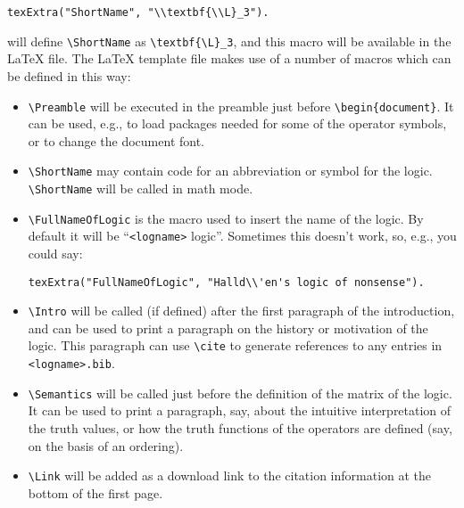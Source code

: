 \documentclass[]{article}
\begin{document}
\begin{itemize}
\begin{verbatim}
texExtra("ShortName", "\\textbf{\\L}_3").
\end{verbatim}

  will define \texttt{\textbackslash{}ShortName} as
  \texttt{\textbackslash{}textbf\{\textbackslash{}L\}\_3}, and this
  macro will be available in the LaTeX file. The LaTeX template file
  makes use of a number of macros which can be defined in this way:

  \begin{itemize}
  \item
    \texttt{\textbackslash{}Preamble} will be executed in the preamble
    just before \texttt{\textbackslash{}begin\{document\}}. It can be
    used, e.g., to load packages needed for some of the operator
    symbols, or to change the document font.
  \item
    \texttt{\textbackslash{}ShortName} may contain code for an
    abbreviation or symbol for the logic.
    \texttt{\textbackslash{}ShortName} will be called in math mode.
  \item
    \texttt{\textbackslash{}FullNameOfLogic} is the macro used to insert
    the name of the logic. By default it will be
    ``\texttt{\textless{}logname\textgreater{}} logic''. Sometimes this
    doesn't work, so, e.g., you could say:

\begin{verbatim}
texExtra("FullNameOfLogic", "Halld\\'en's logic of nonsense").
\end{verbatim}
  \item
    \texttt{\textbackslash{}Intro} will be called (if defined) after the
    first paragraph of the introduction, and can be used to print a
    paragraph on the history or motivation of the logic. This paragraph
    can use \texttt{\textbackslash{}cite} to generate references to any
    entries in \texttt{\textless{}logname\textgreater{}.bib}.
  \item
    \texttt{\textbackslash{}Semantics} will be called just before the
    definition of the matrix of the logic. It can be used to print a
    paragraph, say, about the intuitive interpretation of the truth
    values, or how the truth functions of the operators are defined
    (say, on the basis of an ordering).
  \item
    \texttt{\textbackslash{}Link} will be added as a download link to
    the citation information at the bottom of the first page.
  \end{itemize}
\end{itemize}
\end{document}
